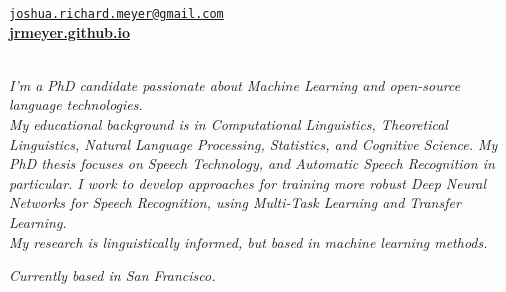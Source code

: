 \documentclass{resume} %
\begin{document}
\vspace{-.25cm}
\begin{center}
  \href{mailto:joshua.richard.meyer@gmail.com}{\nolinkurl{joshua.richard.meyer@gmail.com}}\\
  \vspace{.15cm}
  \href{https://jrmeyer.github.io}{\textbf{jrmeyer.github.io}} \\
  \vspace{.15cm}
  \href{https://github.com/JRMeyer}{\faGithub} \hspace{.25cm} \href{https://www.linkedin.com/in/josh-r-meyer/}{\faLinkedin} \\

\vspace{.5cm}

\textit{I'm a PhD candidate passionate about Machine Learning and open-source language technologies. \\ My educational background is in Computational Linguistics, Theoretical Linguistics, Natural Language Processing, Statistics, and Cognitive Science. My PhD thesis focuses on Speech Technology, and Automatic Speech Recognition in particular. I work to develop approaches for training more robust Deep Neural Networks for Speech Recognition, using Multi-Task Learning and Transfer Learning. \\ My research is linguistically informed, but based in machine learning methods. }

\vspace{.5cm}

\textit{Currently based in San Francisco.}
\end{center}
\end{document}
